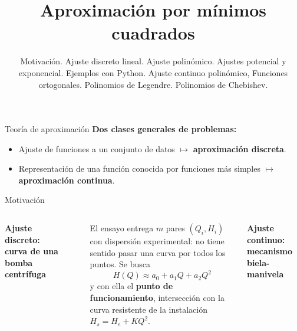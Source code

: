 \documentclass[9pt, aspectratio=169]{beamer}
\title{Aproximación por mínimos cuadrados}
\subtitle{Motivación. Ajuste discreto lineal. Ajuste polinómico. Ajustes potencial y exponencial. Ejemplos con Python. Ajuste continuo polinómico, Funciones ortogonales. Polinomios de Legendre. Polinomios de Chebishev.}
\begin{document}
\maketitle

\begin{frame}{Teoría de aproximación}
  \textbf{Dos clases generales de problemas:}
  \begin{itemize}
    \item Ajuste de funciones a un conjunto de datos $\mapsto$ \textbf{aproximación discreta}.
    \item Representación de una función conocida por funciones más simples $\mapsto$ \textbf{aproximación continua}.
  \end{itemize}
\end{frame}

\begin{frame}{Motivación}
  \begin{columns}[t]
    \textbf{Ajuste discreto: curva de una bomba centrífuga}

    \begin{center}
    \end{center}

    El ensayo entrega $m$ pares $(Q_i, H_i)$ \alert{con dispersión
      experimental}: no tiene sentido pasar una curva por todos los puntos.
    Se busca
    \[ H(Q) \approx a_0 + a_1 Q + a_2 Q^2 \]
    y con ella el \textbf{punto de funcionamiento}, intersección con la curva
    resistente de la instalación $H_s = H_e + K Q^2$.

    \textbf{Ajuste continuo: mecanismo biela-manivela}


\end{columns}
\end{frame}
\end{document}
